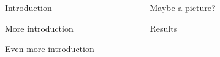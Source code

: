\begin{frame}
\begin{columns}
\begin{column}{.33\textwidth}


  \begin{block}{Introduction}
  
    \ReplaceWithContent %
    
  \end{block}


  \vfill %


  \begin{block}{More introduction} 

    \ReplaceWithContent

  \end{block} 


  \vfill

  
  \begin{block}{Even more introduction}

    \ReplaceWithContent

  \end{block} 


\endminipage
\end{column}
\begin{column}{.34\textwidth}


  \begin{block}{Maybe a picture?}


    \ReplaceWithContent
    \ReplaceWithContent
  \end{block}


  \vfill


  \begin{block}{Results}
    \ReplaceWithContent
  \end{block}


\endminipage
\end{column}
\begin{column}{.33\textwidth}
    


\end{column}
\end{columns}
\end{frame}
